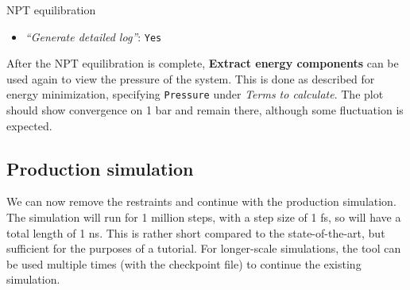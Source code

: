 \documentclass[twocolumn]{bmcart}%
\providecommand{\tightlist}{%
  \setlength{\itemsep}{0pt}\setlength{\parskip}{0pt}}
\begin{document}
\begin{handson_box_colour}{NPT
equilibration}
\begin{itemize}
\begin{itemize}
      \begin{itemize}
      \tightlist
      \item
        \emph{``Bond constraints (constraints)''}:
        \texttt{All\ bonds\ (all-bonds).}
      \item
        \emph{``Temperature /K''}: \texttt{300}
      \item
        \emph{``Step length in ps''}: \texttt{0.002}
      \item
        \emph{``Number of steps that elapse between saving data points
        (velocities, forces, energies)''}: \texttt{1000}
      \item
        \emph{``Number of steps for the simulation''}: \texttt{50000}
      \end{itemize}
    \end{itemize}
  \item
    \emph{``Generate detailed log''}: \texttt{Yes}
  \end{itemize}

\end{handson_box_colour}

After the NPT equilibration is complete, \textbf{Extract energy components} can be used again to view the pressure of the system. This is done as described for energy minimization, specifying \texttt{Pressure} under \emph{Terms to calculate}. The plot should show convergence on 1 bar and remain there, although some fluctuation is expected.

\subsection*{Production simulation}\label{production-simulation}

We can now remove the restraints and continue with the production simulation. The simulation will run for 1 million steps, with a step size of 1 fs, so will have a total length of 1 ns. This is rather short compared to the state-of-the-art, but sufficient for the purposes of a tutorial. For longer-scale simulations, the tool can be used multiple times (with the checkpoint file) to continue the existing simulation.
\end{document}
